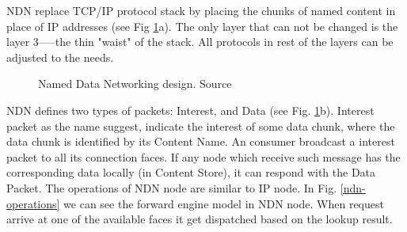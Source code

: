 NDN replace TCP/IP protocol stack by placing the chunks of named content in place of IP addresses (see Fig \ref{fig:ndn-design}a). The only layer that can not be changed is the layer 3–––the thin "waist" of the stack. All protocols in rest of the layers can be adjusted to the needs.
\begin{figure}[h!]
 \hfill 	
\caption{Named Data Networking design. Source \cite{jacobson2009networking}}
\label{fig:ndn-design}
\end{figure}
NDN defines two types of packets: Interest, and Data (see Fig. \ref{fig:ndn-design}b). Interest packet as the name suggest, indicate the interest of some data chunk, where the data chunk is identified by its Content Name. An consumer broadcast a interest packet to all its connection faces. If any node which receive such message has the corresponding data locally (in Content Store), it can respond with the Data Packet. 
The operations of NDN node are similar to IP node. In Fig. \ref{ndn-operations} we can see the forward engine model in NDN node. When request arrive at one of the available faces it get dispatched based on the lookup result. 

